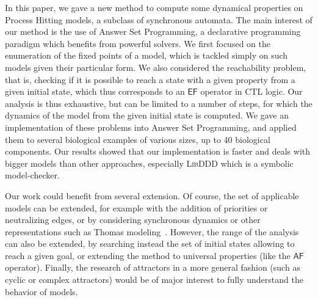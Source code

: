 In this paper, we gave a new method to compute some dynamical properties
on Process Hitting models, a subclass of synchronous automata.
The main interest of our method is the use of Answer Set Programming,
a declarative programming paradigm which benefits from powerful solvers.
We first focused on the enumeration of the fixed points of a model,
which is tackled simply on such models given their particular form.
We also considered the reachability problem, that is,
checking if it is possible to reach a state with a given property
from a given initial state,
which thus corresponds to an $\mathsf{EF}$ operator in CTL logic.
Our analysis is thus exhaustive, but can be limited to a number of steps,
for which the dynamics of the model from the given initial state is computed.
We gave an implementation of these problems into Answer Set Programming,
and applied them to several biological examples of various sizes, up to
40 biological components.
Our results showed that our implementation is faster and deals with bigger models
than other approaches, especially \textsc{LibDDD} which is a symbolic model-checker.

Our work could benefit from several extension.
Of course, the set of applicable models can be extended,
for example with the addition
of priorities or neutralizing edges,
or by considering synchronous dynamics or other representations
such as Thomas modeling~\cite{BernotSemBRN}.
However, the range of the analysis can also be extended,
by searching instead the set of initial states
allowing to reach a given goal,
or extending the method to universal properties (like the $\mathsf{AF}$ operator).
Finally, the research of attractors in a more general fashion
(such as cyclic or complex attractors)
would be of major interest to fully understand the behavior of models.
